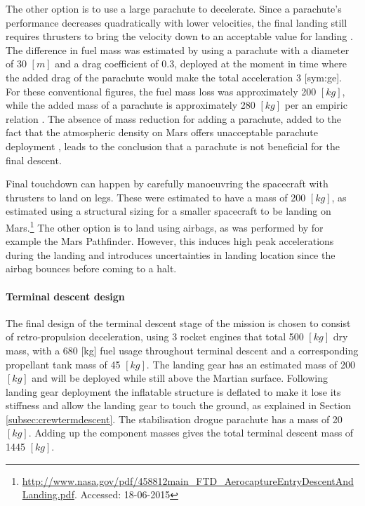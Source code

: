 The other option is to use a large parachute to decelerate. Since a parachute's performance decreases quadratically with lower velocities, the final landing still requires thrusters to bring the velocity down to an acceptable value for landing \cite{Braun2007}. The difference in fuel mass was estimated by using a parachute with a diameter of 30 $[m]$ and a drag coefficient of 0.3, deployed at the moment in time where the added drag of the parachute would make the total acceleration 3 [\gls{sym:ge}]. For these conventional figures, the fuel mass loss was approximately 200 $[kg]$, while the added mass of a parachute is approximately 280 $[kg]$ per an empiric relation \cite{Anderson1969}. The absence of mass reduction for adding a parachute, added to the fact that the atmospheric density on Mars offers unacceptable parachute deployment \cite{Korzun2009}, leads to the conclusion that a parachute is not beneficial for the final descent.

Final touchdown can happen by carefully manoeuvring the spacecraft with thrusters to land on legs. These were estimated to have a mass of 200 $[kg]$, as estimated using a structural sizing for a smaller spacecraft to be landing on Mars.\footnote{\url{http://www.nasa.gov/pdf/458812main_FTD_AerocaptureEntryDescentAndLanding.pdf}. Accessed: 18-06-2015} The other option is to land using airbags, as was performed by for example the Mars Pathfinder. However, this induces high peak accelerations during the landing and introduces uncertainties in landing location since the airbag bounces before coming to a halt.

\paragraph{Terminal descent design}
The final design of the terminal descent stage of the mission is chosen to consist of retro-propulsion deceleration, using 3 rocket engines that total 500 $[kg]$ dry mass, with a 680 [kg] fuel usage throughout terminal descent and a corresponding propellant tank mass of 45 $[kg]$. The landing gear has an estimated mass of 200 $[kg]$ and will be deployed while still above the Martian surface. Following landing gear deployment the inflatable structure is deflated to make it lose its stiffness and allow the landing gear to touch the ground, as explained in Section \ref{subsec:crewtermdescent}. The stabilisation drogue parachute has a mass of 20 $[kg]$. Adding up the component masses gives the total terminal descent mass of 1445 $[kg]$.